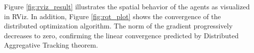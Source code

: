 Figure \ref{fig:rviz_result} illustrates the spatial behavior of the agents as visualized in RViz. In addition, Figure \ref{fig:rqt_plot} shows the convergence of the distributed optimization algorithm. The norm of the gradient progressively decreases to zero, confirming the linear convergence predicted by Distributed Aggregative Tracking theorem.